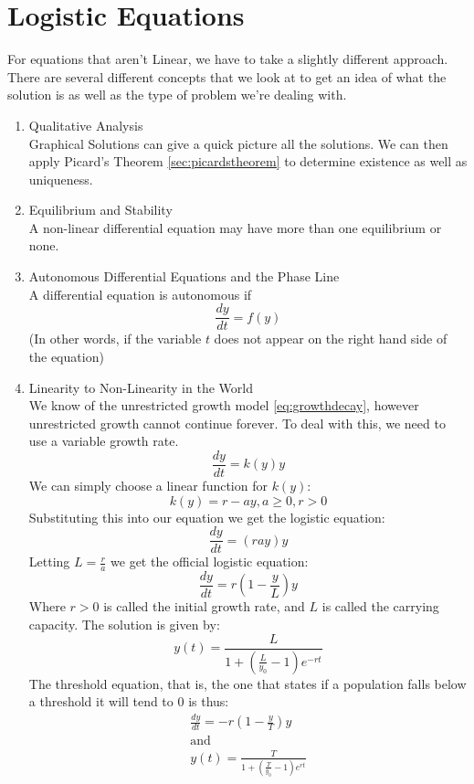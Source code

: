\documentclass[12pt, landscape, twocolumn]{article}
\begin{document}
\section{Logistic Equations}
For equations that aren't Linear, we have to take a slightly different approach. There are several different concepts that we look at to get an idea of what the solution is as well as the type of problem we're dealing with.
\begin{enumerate}
\item Qualitative Analysis\\
Graphical Solutions can give a quick picture all the solutions. We can then apply Picard's Theorem \eqref{sec:picardstheorem} to determine existence as well as uniqueness.
\item Equilibrium and Stability\\
A non-linear differential equation may have more than one equilibrium or none.
\item Autonomous Differential Equations and the Phase Line\\
A differential equation is autonomous if
    \[
    \frac{dy}{dt} = f(y)
    \]
(In other words, if the variable $t$ does not appear on the right hand side of the equation)
\item Linearity to Non-Linearity in the World\\
We know of the unrestricted growth model \eqref{eq:growthdecay}, however unrestricted growth cannot continue forever. To deal with this, we need to use a variable growth rate.
    \[
    \frac{dy}{dt} = k(y) y
    \]
We can simply choose a linear function for $k(y)$:
    \[
    k(y) = r - ay, a \ge 0, r > 0
    \]
Substituting this into our equation we get the logistic equation:
    \[
    \frac{dy}{dt} = (r ay) y
    \]
Letting $L=\frac{r}{a}$ we get the official logistic equation:
    \[
    \frac{dy}{dt} = r \left( 1 - \frac{y}{L} \right) y
    \]
Where $r > 0$ is called the initial growth rate, and $L$ is called the carrying capacity. The solution is given by:
    \[
    y(t) = \frac{L}{1 + \left( \frac{L}{y_0} - 1 \right) e^{-rt} }
    \]
The threshold equation, that is, the one that states if a population falls below a threshold it will tend to $0$ is thus:
\[
\begin{aligned}
\frac{dy}{dt} = -r \left( 1 - \frac{y}{T} \right) y\\
\text{and}\\
y(t) = \frac{T}{1 + \left( \frac{T}{y_0} - 1 \right) e^{rt} }
\end{aligned}
\]


\end{enumerate}
\end{document}
